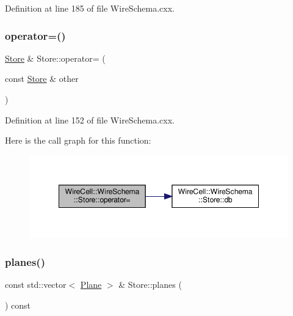 Definition at line 185 of file Wire\+Schema.\+cxx.

\mbox{\label{class_wire_cell_1_1_wire_schema_1_1_store_aaffe7ef01a51fac30565a9d537becba2}} 
\subsubsection{\texorpdfstring{operator=()}{operator=()}}
{\footnotesize\ttfamily \hyperlink{class_wire_cell_1_1_wire_schema_1_1_store}{Store} \& Store\+::operator= (\begin{DoxyParamCaption}\item[{const \hyperlink{class_wire_cell_1_1_wire_schema_1_1_store}{Store} \&}]{other }\end{DoxyParamCaption})}



Definition at line 152 of file Wire\+Schema.\+cxx.

Here is the call graph for this function\+:
\nopagebreak
\begin{figure}[H]
\begin{center}
\leavevmode
\includegraphics[width=348pt]{class_wire_cell_1_1_wire_schema_1_1_store_aaffe7ef01a51fac30565a9d537becba2_cgraph}
\end{center}
\end{figure}
\mbox{\label{class_wire_cell_1_1_wire_schema_1_1_store_aaedfc8ae05d2fe0ef02da6e9d8e8eca1}} 
\subsubsection{\texorpdfstring{planes()}{planes()}\hspace{0.1cm}{\footnotesize\ttfamily [1/2]}}
{\footnotesize\ttfamily const std\+::vector$<$ \hyperlink{struct_wire_cell_1_1_wire_schema_1_1_plane}{Plane} $>$ \& Store\+::planes (\begin{DoxyParamCaption}{ }\end{DoxyParamCaption}) const}




